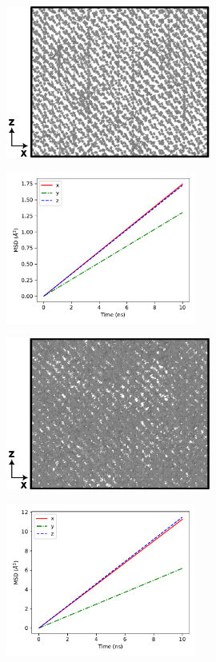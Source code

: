 \documentclass{elsarticle}
\begin{document}
\begin{figure}[!ht]
\centering
	\begin{subfigure}{0.49\textwidth}
		\centering
		\caption{}
		\includegraphics[height=5cm]{130at700cs.png}
	\end{subfigure}
	\begin{subfigure}{0.49\textwidth}
		\centering
		\caption{}
		\includegraphics[height=5cm]{130at700xyz.pdf}
	\end{subfigure}
    \par\medskip
	\begin{subfigure}{0.49\textwidth}
		\centering
		\caption{}
		\includegraphics[height=5cm]{130at1100cs.png}
	\end{subfigure}
	\begin{subfigure}{0.49\textwidth}
		\centering
		\caption{}
		\includegraphics[height=5cm]{130at1100xyz.pdf}

\end{subfigure}
\end{figure}
\end{document}

